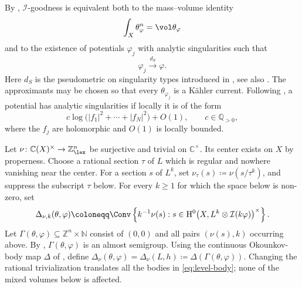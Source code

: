 \documentclass[11pt,a4paper]{amsart}
\newcommand{\dS}{d_{S}}
\begin{document}
By \cite[Theorem~7.1.1]{Xiabook}, $\mathcal{I}$-goodness is equivalent both to the mass--volume identity
\[
 \int_X\theta_\varphi^n=\vol \theta_{\varphi}
\]
and to the existence of potentials $\varphi_j$ with analytic singularities such that
\[
 \varphi_j\xrightarrow{\dS}\varphi.
\]
Here $\dS$ is the pseudometric on singularity types introduced in \cite{DDNLmetric}, see also \cite[Definition~6.2.1]{Xiabook}. The approximants may be chosen so that every $\theta_{\varphi_j}$ is a K\"ahler current.  Following \cite[Definition~1.6.1]{Xiabook}, a potential has analytic singularities if locally it is of the form
\[
 c\log\bigl(|f_1|^2+\cdots+|f_N|^2\bigr)+O(1), \qquad c\in\mathbb Q_{>0},
\]
where the $f_j$ are holomorphic and $O(1)$ is locally bounded.

Let $\nu\colon\mathbb C(X)^\times\to\mathbb Z^n_{\lex}$ be surjective and
trivial on $\mathbb C^\times$.  Its center exists on $X$ by properness.
Choose a rational section $\tau$ of $L$ which is regular and nowhere
vanishing near the center.  For a section $s$ of $L^k$, set
$\nu_\tau(s)\coloneqq \nu(s/\tau^k)$, and suppress the subscript $\tau$ below.
For every $k\geq1$ for which the space below is non-zero, set
\begin{equation}\label{eq:level-body}
 \Delta_{\nu,k}(\theta,\varphi)
 \coloneqq \Conv\left\{k^{-1}\nu(s): s\in \mathrm{H}^0\bigl(X,L^k\otimes\mathcal{I}(k\varphi)\bigr)^{\times}\right\}.
\end{equation}
Let $\Gamma(\theta,\varphi)\subseteq\mathbb Z^n\times\mathbb N$ consist of
$(0,0)$ and all pairs $(\nu(s),k)$ occurring above.  By
\cite[Theorem~10.3.1]{Xiabook}, $\Gamma(\theta,\varphi)$ is an almost
semigroup.  Using the continuous Okounkov-body map $\Delta$ of
\cite[Theorem~10.1.2]{Xiabook}, define
$\Delta_\nu(\theta,\varphi)=\Delta_\nu(L,h)
\coloneqq \Delta(\Gamma(\theta,\varphi))$.  Changing the rational
trivialization translates all the bodies in \eqref{eq:level-body}; none of
the mixed volumes below is affected.
\end{document}
